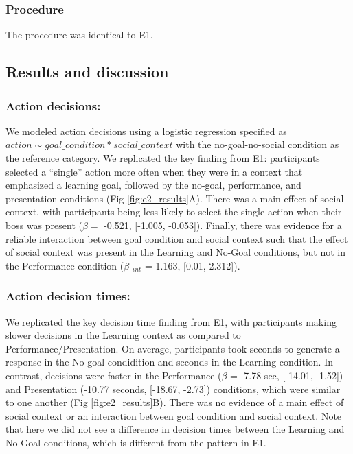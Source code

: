 \documentclass[10pt, letterpaper]{article}
\begin{document}
\subsubsection{Procedure}\label{procedure-1}

The procedure was identical to E1.

\subsection{Results and discussion}\label{results-and-discussion-1}

\subsubsection{Action decisions:}\label{action-decisions-1}

We modeled action decisions using a logistic regression specified as
\texttt{$action \sim goal\_condition * social\_context$} with the
no-goal-no-social condition as the reference category. We replicated the
key finding from E1: participants selected a ``single'' action more
often when they were in a context that emphasized a learning goal,
followed by the no-goal, performance, and presentation conditions (Fig
\ref{fig:e2_results}A). There was a main effect of social context, with
participants being less likely to select the single action when their
boss was present (\(\beta =\) -0.521, {[}-1.005, -0.053{]}). Finally,
there was evidence for a reliable interaction between goal condition and
social context such that the effect of social context was present in the
Learning and No-Goal conditions, but not in the Performance condition
(\(\beta\) \(_{int}\) = 1.163, {[}0.01, 2.312{]}).

\subsubsection{Action decision times:}\label{action-decision-times-1}

We replicated the key decision time finding from E1, with participants
making slower decisions in the Learning context as compared to
Performance/Presentation. On average, participants took seconds to
generate a response in the No-goal condidition and seconds in the
Learning condition. In contrast, decisions were faster in the
Performance (\(\beta\) = -7.78 sec, {[}-14.01, -1.52{]}) and
Presentation (-10.77 seconds, {[}-18.67, -2.73{]}) conditions, which
were similar to one another (Fig \ref{fig:e2_results}B). There was no
evidence of a main effect of social context or an interaction between
goal condition and social context. Note that here we did not see a
difference in decision times between the Learning and No-Goal
conditions, which is different from the pattern in E1.
\end{document}
